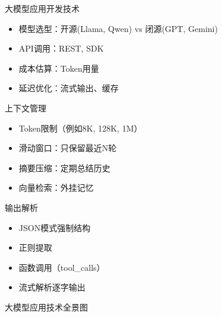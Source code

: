 \begin{frame}{大模型应用开发技术}
\begin{itemize}
    \item 模型选型：开源(Llama, Qwen) vs 闭源(GPT, Gemini)
    \item API调用：REST, SDK
    \item 成本估算：Token用量
    \item 延迟优化：流式输出、缓存
\end{itemize}
\end{frame}

\begin{frame}{上下文管理}
\begin{itemize}
    \item Token限制（例如8K, 128K, 1M）
    \item 滑动窗口：只保留最近N轮
    \item 摘要压缩：定期总结历史
    \item 向量检索：外挂记忆
\end{itemize}
\end{frame}

\begin{frame}{输出解析}
\begin{itemize}
    \item JSON模式强制结构
    \item 正则提取
    \item 函数调用（tool\_calls）
    \item 流式解析逐字输出
\end{itemize}
\end{frame}

\begin{frame}{大模型应用技术全景图}
\begin{center}
\end{center}
\end{frame}


